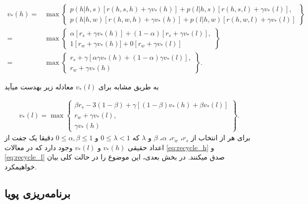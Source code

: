 \begin{align}
v_*(h) =& \max \left\{ 
\begin{array}{lr}
   p(h|h,s) \left[ r(h,s,h)+ \gamma v_*(h) \right] + p(l|h,s) \left[ r(h,s,l)+\gamma v_*(l) \right], \\ 
   p(h|h,w)[r(h,w,h)+ \gamma v_*(h)]+p(l|h,w)[r(h,w,l)+\gamma v_*(l)]
\end{array}
\right\} \nonumber \\
 =& \max \left\{ 
\begin{array}{lr}
   \alpha \left[ r_s+ \gamma v_*(h) \right] + (1 - \alpha) \left[ r_s+\gamma v_*(l) \right], \\ 
   1 \left[ r_w + \gamma v_*(h)]+ 0[r_w + \gamma v_*(l)]
\end{array}
\right\} \\
 =& \max \left\{ 
\begin{array}{lr}
   r_s + \gamma \left[  \alpha \gamma v_*(h) + (1 - \alpha) \gamma v_*(l) \right], \\ 
   r_w + \gamma v_* (h)
\end{array}
\right\}.
\label{eq:recycle_h}
\end{align}


به طریق مشابه برای 
$v_*(l)$
معادله زیر به\nf دست می\nf آید


\begin{align}
	v_*(l) = \max \left \{ 
	\begin{array}{lr}
		\beta r_s - 3(1-\beta) + \gamma \left[ (1-\beta) v_*(h)+\beta v_*(l)\right] \\
		r_w + \gamma v_*(l), \\
		\gamma v_*(h)
	\end{array}
	\right \}.
	\label{eq:recycle_l}
\end{align}
برای هر از انتخاب از 
$r_s$،
$r_w$،
$\alpha$،
$\beta$
و $\lambda$ که 
$0 \le \lambda < 1$
و
$0 \le \alpha,\beta \le 1$
دقیقا یک جفت از اعداد حقیقی 
$v_*(h)$
و 
$v_*(l)$
وجود دارد که در معالات
\ref{eq:recycle_h}
و
\ref{eq:recycle_l}
 صدق می\nf کنند. در بخش بعدی، این موضوع را در حالت کلی بیان خواهیم\nf کرد.




\subsection{برنامه‌ریزی پویا}

